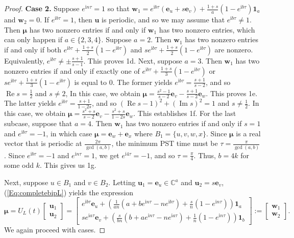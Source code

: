 \documentclass{article}
\numberwithin{equation}{section}
\newcommand{\uno}{\mathbf 1}
\newcommand{\be}{\mathbf e}
\newcommand{\bu}{\mathbf u}
\newcommand{\bw}{\mathbf w}
\newcommand{\bmu}{{\boldsymbol{\mu}}}
\def\C{\mathbb{C}}
\def\ii{\mathrm{i}}
\begin{document}
{\begin{proof}
\noindent \textbf{Case 2.} Suppose $e^{\ii n \tau}=1$ so that $\bw_1=e^{\ii b \tau}(\be_u+s\be_v)+\frac{1+s}{a}(1-e^{\ii b \tau})\uno_a$ and $\bw_2=0$. If $e^{\ii b \tau}=1$, then $\bu$ is periodic, and so we may assume that $e^{\ii b \tau}\neq 1$. Then $\bmu$ has two nonzero entries if and only if $\bw_1$ has two nonzero entries, which can only happen if $a\in\{2,3,4\}$. Suppose $a=2$. Then $\bw_1$ has two nonzero entries if and only if both $e^{\ii b \tau}+\frac{1+s}{2}(1-e^{\ii b \tau})$ and $se^{\ii b \tau}+\frac{1+s}{2}(1-e^{\ii b \tau})$ are nonzero. Equivalently, $e^{\ii b \tau}\neq \pm \frac{s+1}{s-1}$. This proves 1d. Next, suppose $a=3$. Then $\bw_1$ has two nonzero entries if and only if exactly one of $e^{\ii b \tau}+\frac{1+s}{3}(1-e^{\ii b \tau})$ or $se^{\ii b \tau}+\frac{1+s}{3}(1-e^{\ii b \tau})$ is equal to 0. The former yields $e^{\ii b \tau}=\frac{s+1}{s-2}$, and so $\operatorname{Re}s=\frac{1}{2}$ and $s\neq 2$, In this case, we obtain $\bmu=\frac{s^2-1}{s-2}\be_v-\frac{s+1}{s-2}\be_w$. This proves 1e. The latter yields $e^{\ii b \tau}=\frac{s+1}{1-2s}$, and so $(\operatorname{Re}s-1)^2+(\operatorname{Im}s)^2=1$ and $s\neq \frac{1}{2}$. In this case, we obtain $\bmu=\frac{s^2+s}{s-2}\be_v-\frac{s^2+s}{1-2s}\be_w$. This establishes 1f. For the last subcase, suppose that $a=4$. Then $\bw_1$ has two nonzero entries if and only if $s=1$ and $e^{\ii b \tau}=-1$, in which case $\bmu=\be_w+\be_x$ where $B_1=\{u,v,w,x\}$. Since $\bmu$ is a real vector that is periodic at $\frac{2\pi}{\operatorname{gcd}(a,b)}$, the minimum PST time must be $\tau=\frac{\pi}{\operatorname{gcd}(a,b)}$ \cite[Lemma 5.1(2)]{godsil2025perfect}. Since $e^{\ii b \tau}=-1$ and $e^{\ii n \tau}=1$, we get $e^{\ii 4\tau}=-1$, and so $\tau=\frac{\pi}{4}$. Thus, $b=4k$ for some odd $k$. This gives us 1g.

Next, suppose $u\in B_1$ and $v\in B_2$. Letting $\bu_1=\be_u\in\C^a$ and $\bu_2=s\be_v$, (\ref{Eq:completebipL}) yields the expression
\begin{equation}
\label{Eq:kmnlapsh}
\bmu=U_L(t)\begin{bmatrix}
\bu_1\\ \bu_2\end{bmatrix}=\begin{bmatrix}
e^{\ii b \tau}\be_u+\left(\frac{1}{an}(a+be^{\ii n \tau}-ne^{\ii b \tau})+\frac{s}{n}(1-e^{\ii n \tau})\right)\uno_a\\ se^{\ii a \tau}\be_v+\left(\frac{s}{bn}(b+ae^{\ii n \tau}-ne^{\ii a \tau})+\frac{1}{n}(1-e^{\ii n \tau})\right)\uno_b
\end{bmatrix}:=\begin{bmatrix}\bw_1\\\bw_2\end{bmatrix}. 
\end{equation}
We again proceed with cases.


\end{proof}}
\end{document}
